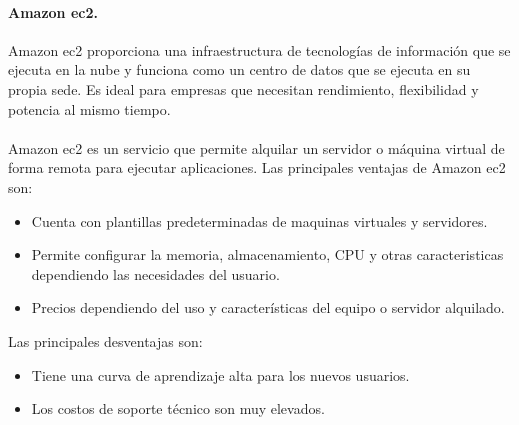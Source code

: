 \documentclass[12pt, a4paper, titlepage]{report}
\begin{document}

	   	\paragraph{Amazon \acrshort{ec2}. \\}
	   	Amazon \acrfull{ec2} proporciona una infraestructura de tecnologías de información que se ejecuta en la nube y funciona como un centro de datos que se ejecuta en su propia sede. Es ideal para empresas que necesitan rendimiento, flexibilidad y potencia al mismo tiempo.\\\\
	   	Amazon \acrshort{ec2} es un servicio que permite alquilar un servidor o máquina virtual de forma remota para ejecutar aplicaciones.	
	   	Las principales ventajas de Amazon \acrshort{ec2} son: 
	   	\begin{itemize}
	   		\item Cuenta con plantillas predeterminadas de maquinas virtuales y servidores.
	   		\item Permite configurar la memoria, almacenamiento, CPU y otras caracteristicas dependiendo las necesidades del usuario.
	   		\item Precios dependiendo del uso y características del equipo o servidor alquilado.
	   	\end{itemize}
	   	
	   	Las principales desventajas son: 
	   	\begin{itemize}
	   		\item Tiene una curva de aprendizaje alta para los nuevos usuarios.
	   		\item Los costos de soporte técnico son muy elevados.
	   	\end{itemize}		
\end{document}
